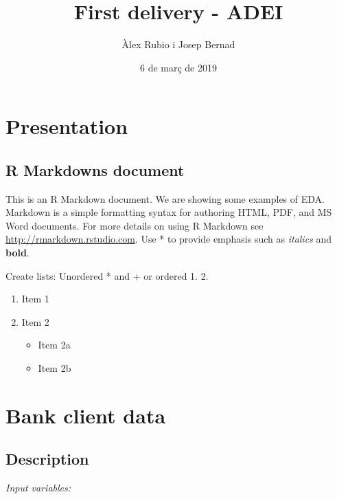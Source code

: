 \documentclass[]{article}
\title{First delivery - ADEI}
\author{Àlex Rubio i Josep Bernad}
\date{6 de març de 2019}
\providecommand{\tightlist}{%
  \setlength{\itemsep}{0pt}\setlength{\parskip}{0pt}}
\begin{document}
\maketitle

{
\setcounter{tocdepth}{3}
\tableofcontents
}
\section{Presentation}\label{presentation}

\subsection{R Markdowns document}\label{r-markdowns-document}

This is an R Markdown document. We are showing some examples of EDA.
Markdown is a simple formatting syntax for authoring HTML, PDF, and MS
Word documents. For more details on using R Markdown see
\url{http://rmarkdown.rstudio.com}. Use * to provide emphasis such as
\emph{italics} and \textbf{bold}.

Create lists: Unordered * and + or ordered 1. 2.

\begin{enumerate}
\def\labelenumi{\arabic{enumi}.}
\tightlist
\item
  Item 1
\item
  Item 2

  \begin{itemize}
  \tightlist
  \item
    Item 2a
  \item
    Item 2b
  \end{itemize}
\end{enumerate}

\section{Bank client data}\label{bank-client-data}

\subsection{Description}\label{description}

\emph{Input variables:}
\end{document}

